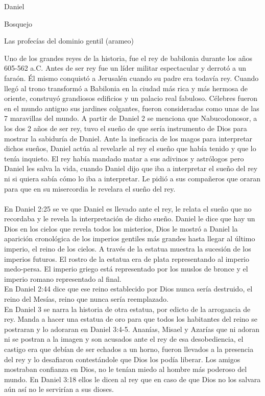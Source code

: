 \begin{section}{Daniel}
\begin{subsection}{Bosquejo}
\begin{subsubsection}{Las profecías del dominio gentil (arameo)}
\begin{enumerate}
					Uno de los grandes reyes de la historia, fue el rey de babilonia durante los años 605-562 a.C. Antes de ser rey fue un líder militar espectacular y derrotó a un faraón. Él mismo conquistó a Jerusalén cuando su padre era todavía rey. Cuando llegó al trono transformó a Babilonia en la ciudad más rica y más hermosa de oriente, construyó grandiosos edificios y un palacio real fabuloso. Célebres fueron en el mundo antiguo sus jardines colgantes, fueron consideradas como unas de las 7 maravillas del mundo. A partir de Daniel 2 se menciona que Nabucodonosor, a los dos 2 años de ser rey, tuvo el sueño de que sería instrumento de Dios para mostrar la sabiduría de Daniel. Ante la ineficacia de los magos para interpretar dichos sueños, Daniel actúa al revelarle al rey el sueño que había tenido y que lo tenía inquieto. El rey había mandado matar a sus adivinos y astrólogos pero Daniel les salva la vida, cuando Daniel dijo que iba a interpretar el sueño del rey ni si quiera sabía cómo lo iba a interpretar. Le pidió a sus compañeros que oraran para que en su misercordia le revelara el sueño del rey.\\
					\\
					En Daniel 2:25 se ve que Daniel es llevado ante el rey, le relata el sueño que no recordaba y le revela la interpretación de dicho sueño. Daniel le dice que hay un Dios en los cielos que revela todos los misterios, Dios le mostró a Daniel la aparición cronológica de los imperios gentiles más grandes hasta llegar al último imperio, el reino de los cielos. A través de la estatua muestra la sucesión de los imperios futuros. El rostro de la estatua era de plata representando al imperio medo-persa. El imperio griego está representado por los muslos de bronce y el imperio romano representado al final.\\
					En Daniel 2:44 dice que ese reino establecido por Dios nunca sería destruido, el reino del Mesías, reino que nunca sería reemplazado.\\
					En Daniel 3 se narra la historia de otra estatua, por edicto de la arrogancia de rey. Manda a hacer una estatua de oro para que todos los habitantes del reino se postraran y lo adoraran en Daniel 3:4-5.
					\newpage
					Ananías, Misael y Azarías que ni adoran ni se postran a la imagen y son acusados ante el rey de esa desobediencia, el castigo era que debían de ser echados a un horno, fueron llevados a la presencia del rey y lo desafiaron contestándole que Dios los podía liberar. Los amigos mostraban confianza en Dios, no le tenían miedo al hombre más poderoso del mundo. En Daniel 3:18 ellos le dicen al rey que en caso de que Dios no los salvara aún así no le servirían a sus dioses.\\

\end{enumerate}
\end{subsubsection}
\end{subsection}
\end{section}
